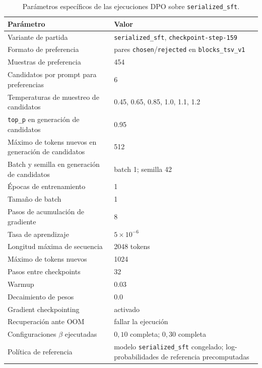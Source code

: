 \begin{table}[htbp]
\centering
\caption{Parámetros específicos de las ejecuciones DPO sobre \texttt{serialized\_sft}.}
\label{tab:AnexoA_dpo}
\begin{tabularx}{\textwidth}{p{}X}
\toprule
\textbf{Parámetro} & \textbf{Valor} \\
\midrule
Variante de partida & \texttt{serialized\_sft}, \texttt{checkpoint-step-159} \\
Formato de preferencia & pares \texttt{chosen}/\texttt{rejected} en \texttt{blocks\_tsv\_v1} \\
Muestras de preferencia & 454 \\
Candidatos por prompt para preferencias & 6 \\
Temperaturas de muestreo de candidatos & 0.45, 0.65, 0.85, 1.0, 1.1, 1.2 \\
\texttt{top\_p} en generación de candidatos & 0.95 \\
Máximo de tokens nuevos en generación de candidatos & 512 \\
Batch y semilla en generación de candidatos & batch 1; semilla 42 \\
Épocas de entrenamiento & 1 \\
Tamaño de batch & 1 \\
Pasos de acumulación de gradiente & 8 \\
Tasa de aprendizaje & $5\times10^{-6}$ \\
Longitud máxima de secuencia & 2048 tokens \\
Máximo de tokens nuevos & 1024 \\
Pasos entre checkpoints & 32 \\
Warmup & 0.03 \\
Decaimiento de pesos & 0.0 \\
Gradient checkpointing & activado \\
Recuperación ante OOM & fallar la ejecución \\
Configuraciones \(\beta\) ejecutadas & \(0{,}10\) completa; \(0{,}30\) completa \\
Política de referencia & modelo \texttt{serialized\_sft} congelado; log-probabilidades de referencia precomputadas \\
\bottomrule
\end{tabularx}
\end{table}

